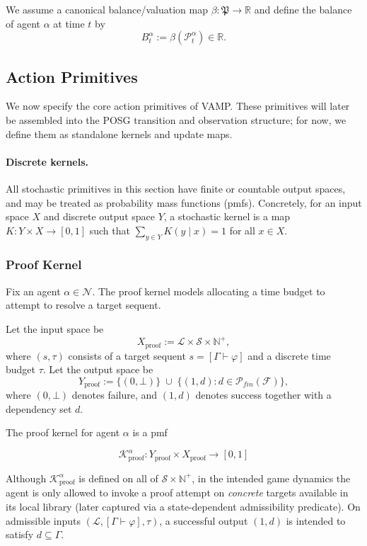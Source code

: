 \documentclass[letterpaper]{article} %
\renewcommand{\phi}{\varphi}
\newcommand{\proves}{\vdash}
\begin{document}
We assume a canonical balance/valuation map $\beta:\mathfrak{P}\to\mathbb{R}$ and define the balance of agent $\alpha$ at time $t$ by
\[
B^\alpha_t := \beta(\mathcal{P}^\alpha_t)\in\mathbb{R}.
\]



\subsection{Action Primitives}

We now specify the core action primitives of VAMP. These primitives will later be assembled into the
POSG transition and observation structure; for now, we define them as standalone kernels and update maps.

\paragraph{Discrete kernels.}
All stochastic primitives in this section have finite or countable output spaces, and may be treated as
probability mass functions (pmfs). Concretely, for an input space $X$ and discrete output space $Y$,
a stochastic kernel is a map $K:Y\times X\to[0,1]$ such that $\sum_{y\in Y}K(y\mid x)=1$ for all $x\in X$.

\subsubsection{Proof Kernel}

Fix an agent $\alpha\in\mathcal{N}$. The proof kernel models allocating a time budget to attempt to resolve a target sequent.

Let the input space be
\[
X_{\mathrm{proof}} := \mathscr{L}\times\mathcal{S}\times \mathbb{N}^+,
\]
where $(s,\tau)$ consists of a target sequent $s=[\Gamma\proves\phi]$ and a discrete time budget $\tau$.
Let the output space be
\[
Y_{\mathrm{proof}} := \{(0,\bot)\}\;\cup\;\{(1,d): d\in\mathcal{P}_{fin}(\mathcal{F})\},
\]
where $(0,\bot)$ denotes failure, and $(1,d)$ denotes success together with a dependency set $d$.

The proof kernel for agent $\alpha$ is a pmf

\[\mathcal{K}^{\alpha}_{\mathrm{proof}} : Y_{\mathrm{proof}}\times X_{\mathrm{proof}} \to [0,1]\]


Although $\mathcal{K}^{\alpha}_{\mathrm{proof}}$ is defined on all of $\mathcal{S}\times\mathbb{N}^+$,
in the intended game dynamics the agent is only allowed to invoke a proof attempt on \emph{concrete} targets
available in its local library (later captured via a state-dependent admissibility predicate).
On admissible inputs $(\mathcal{L},[\Gamma\proves\phi],\tau)$, a successful output $(1,d)$ is intended to satisfy $d\subseteq\Gamma$.
\end{document}
